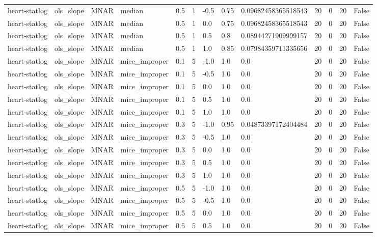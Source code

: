 \begin{tabular}{lllllllllllll}
heart-statlog & ols\_slope & MNAR & median & 0.5 & 1 & -0.5 & 0.75 & 0.09682458365518543 & 20 & 0 & 20 & False \\
heart-statlog & ols\_slope & MNAR & median & 0.5 & 1 & 0.0 & 0.75 & 0.09682458365518543 & 20 & 0 & 20 & False \\
heart-statlog & ols\_slope & MNAR & median & 0.5 & 1 & 0.5 & 0.8 & 0.08944271909999157 & 20 & 0 & 20 & False \\
heart-statlog & ols\_slope & MNAR & median & 0.5 & 1 & 1.0 & 0.85 & 0.07984359711335656 & 20 & 0 & 20 & False \\
heart-statlog & ols\_slope & MNAR & mice\_improper & 0.1 & 5 & -1.0 & 1.0 & 0.0 & 20 & 0 & 20 & False \\
heart-statlog & ols\_slope & MNAR & mice\_improper & 0.1 & 5 & -0.5 & 1.0 & 0.0 & 20 & 0 & 20 & False \\
heart-statlog & ols\_slope & MNAR & mice\_improper & 0.1 & 5 & 0.0 & 1.0 & 0.0 & 20 & 0 & 20 & False \\
heart-statlog & ols\_slope & MNAR & mice\_improper & 0.1 & 5 & 0.5 & 1.0 & 0.0 & 20 & 0 & 20 & False \\
heart-statlog & ols\_slope & MNAR & mice\_improper & 0.1 & 5 & 1.0 & 1.0 & 0.0 & 20 & 0 & 20 & False \\
heart-statlog & ols\_slope & MNAR & mice\_improper & 0.3 & 5 & -1.0 & 0.95 & 0.04873397172404484 & 20 & 0 & 20 & False \\
heart-statlog & ols\_slope & MNAR & mice\_improper & 0.3 & 5 & -0.5 & 1.0 & 0.0 & 20 & 0 & 20 & False \\
heart-statlog & ols\_slope & MNAR & mice\_improper & 0.3 & 5 & 0.0 & 1.0 & 0.0 & 20 & 0 & 20 & False \\
heart-statlog & ols\_slope & MNAR & mice\_improper & 0.3 & 5 & 0.5 & 1.0 & 0.0 & 20 & 0 & 20 & False \\
heart-statlog & ols\_slope & MNAR & mice\_improper & 0.3 & 5 & 1.0 & 1.0 & 0.0 & 20 & 0 & 20 & False \\
heart-statlog & ols\_slope & MNAR & mice\_improper & 0.5 & 5 & -1.0 & 1.0 & 0.0 & 20 & 0 & 20 & False \\
heart-statlog & ols\_slope & MNAR & mice\_improper & 0.5 & 5 & -0.5 & 1.0 & 0.0 & 20 & 0 & 20 & False \\
heart-statlog & ols\_slope & MNAR & mice\_improper & 0.5 & 5 & 0.0 & 1.0 & 0.0 & 20 & 0 & 20 & False \\
heart-statlog & ols\_slope & MNAR & mice\_improper & 0.5 & 5 & 0.5 & 1.0 & 0.0 & 20 & 0 & 20 & False \\

\end{tabular}
